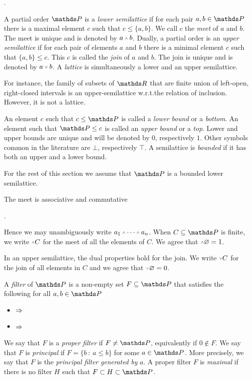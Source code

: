 .

A partial order $\PP$ is a \emph{lower semilattice\/} if for each pair $a,b\in\PP$ there is a maximal element $c$ such that $c\le\{a,b\}$.
We call $c$ the \emph{meet\/} of $a$ and $b$.
The meet is unique and is denoted by \emph{$a\swedge b$}.
Dually, a partial order is an \emph{upper semilattice\/} if for each pair of elements $a$ and $b$ there is a minimal element $c$ such that $\{a,b\}\le c$.
This $c$ is called the \emph{join\/} of $a$ and $b$.
The join is unique and is denoted by \emph{$a\svee b$}.
A \emph{lattice\/} is simultaneously a lower and an upper semilattice.

For instance, the family of subsets of $\RR$ that are finite union of left-open, right-closed intervals is an upper-semilattice w.r.t.\@ the relation of inclusion.
However, it is not a lattice. 

An element $c$ such that $c\le \PP$ is called a \emph{lower bound\/} or a \emph{bottom}.
An element such that $\PP\le c$ is called an \emph{upper bound\/} or a \emph{top}.
Lower and upper bounds are unique and will be denoted by \emph{$0$}, respectively \emph{$1$}.
Other symbols common in the literature are \emph{$\bot$}, respectively \emph{$\top$}.
A semilattice is \emph{bounded\/} if it has both an upper and a lower bound.

For the rest of this section we assume that $\PP$ is a bounded lower semilattice.

The meet is associative and commutative


.

Hence we may unambiguously write $a_1\swedge\dots\swedge a_n$.
When $C\subseteq\PP$ is finite, we write \emph{$\swedge C$} for the meet of all the elements of $C$.
We agree that $\swedge\varnothing=1$.

In an upper semilattice, the dual properties hold for the join.
We write \emph{$\svee C$\/} for the join of all elements in $C$ and we agree that $\svee\varnothing=0$.

A \emph{filter\/} of $\PP$ is a non-empty set $F\subseteq \PP$ that satisfies the following for all $a,b\in \PP$

\begin{itemize}
\def\ceq#1#2#3{\hspace*{16ex}\llap{$#1$}\parbox{5ex}{\hfil$#2$}\rlap{$#3$}}
\item[f1.] \ceq{a\in F\ \textrm{ and }\ a\le b}{\IMP}{b\in F}
\item[f2.] \ceq{a, b\in F}{\IMP}{a\swedge  b\in F.}
\end{itemize}
We say that $F$ is a \emph{proper filter\/} if $F\neq \PP$, equivalently if $0\notin F$.
We say that $F$ is \emph{principal\/} if $F=\big\{b\ :\ a\le b\big\}$ for some $a\in \PP$.
More precisely, we say that $F$ is the \emph{principal filter generated by $a$}.
A proper filter $F$ is \emph{maximal\/} if there is no filter $H$ such that $F\subset H\subset \PP$.

